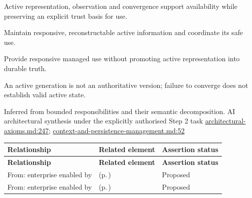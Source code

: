 Active representation, observation and convergence support availability while preserving an explicit trust basis for use.



Maintain responsive, reconstructable active information and coordinate its safe use.



Provide responsive managed use without promoting active representation into durable truth.



An active generation is not an authoritative version; failure to converge does not establish valid active state.


Inferred from bounded responsibilities and their semantic decomposition. AI architectural synthesis under the explicitly authorised Step 2 task \hyperref[evidence:27549d51551beae6]{architectural-axioms.md:247}; \hyperref[evidence:ea0c62dfd5edfd4a]{context-and-persistence-management.md:52}
\begingroup\small\setlength{\TableWidth}{\dimexpr\linewidth-6\tabcolsep-4\arrayrulewidth\relax}
\begin{longtable}{|>{\raggedright\arraybackslash}p{0.27\TableWidth}|>{\raggedright\arraybackslash}p{0.48\TableWidth}|>{\raggedright\arraybackslash}p{0.25\TableWidth}|}
\hline\rowcolor{TableHead}\textbf{Relationship} & \textbf{Related element} & \textbf{Assertion status}\\\hline\endfirsthead
\hline\rowcolor{TableHead}\textbf{Relationship} & \textbf{Related element} & \textbf{Assertion status}\\\hline\endhead
\hline\endfoot
From: enterprise enabled by & \nameref{cap:bec-patient-clinical-record} (p.\,\pageref{cap:bec-patient-clinical-record}) & Proposed\\\hline
From: enterprise enabled by & \nameref{cap:bec-governed-reference-dataset-administration} (p.\,\pageref{cap:bec-governed-reference-dataset-administration}) & Proposed\\\hline
\end{longtable}\endgroup

